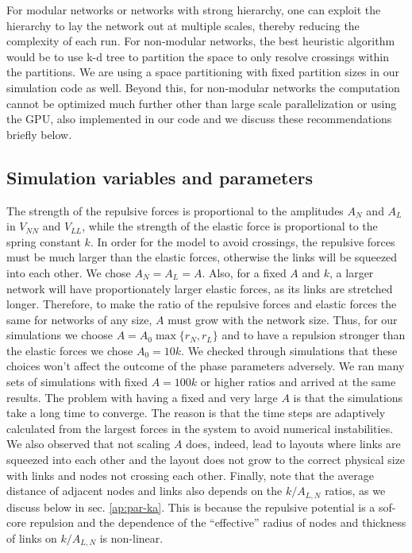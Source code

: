 \documentclass[endfloats,nofootinbib,preprint,floatfix,titlepage,superscriptaddress,linenumbers]{revtex4-1} %
\begin{document}
{For modular networks or networks with strong hierarchy, one can exploit the hierarchy to lay the network out at multiple scales, thereby reducing the complexity of each run. 
For non-modular networks, the best heuristic algorithm would be to use k-d tree to partition the space to only resolve crossings within the partitions. %
We are using a space partitioning with fixed partition sizes in our simulation code as well. 
Beyond this, for non-modular networks the computation cannot be optimized much further other than large scale parallelization or using the GPU, also implemented in our code and  
we discuss these recommendations briefly below.


\subsection{Simulation variables and parameters}
The strength of the repulsive forces is proportional to the amplitudes $A_N$ and $A_L$ in $V_{NN}$ and $V_{LL}$, while the  strength of the elastic force is proportional to the spring constant $k$. 
In order for the model to avoid crossings, the repulsive forces must be  much larger than the elastic forces, otherwise the links will be squeezed into each other. 
We chose $A_N=A_L = A$.
Also, for a fixed $A$ and $k$, a larger network will have proportionately larger elastic forces, as its links are stretched longer. 
Therefore, to make the ratio of the repulsive forces and elastic forces the same for networks of any size, $A$ must grow with the network size. 
Thus, for our simulations we choose $A = A_0 \max\{r_N, r_L\}$ and to have a repulsion stronger than the elastic forces we chose $A_0 = 10 k$. 
We checked through simulations that these choices won't affect the outcome of the phase parameters adversely. 
We ran many sets of simulations with fixed $A = 100k $ or higher ratios and arrived at the same results. 
The problem with having a fixed and very large $A$ is that the simulations take a long time to converge. 
The reason is that the time steps are adaptively calculated from the largest forces in the system to avoid numerical instabilities. 
We also observed that not scaling $A$ does, indeed, lead to layouts where links are squeezed into each other and the layout does not grow to the correct physical size with links and nodes not crossing each other.  
Finally, note that the average distance of adjacent nodes and links also depends on the $k/A_{L,N}$ ratios, as we discuss below in sec. \ref{ap:par-ka}. 
This is because the repulsive potential is a sof-core repulsion and the dependence of the ``effective'' radius of nodes and thickness of links on $k/A_{L,N}$ is non-linear.

}
\end{document}
